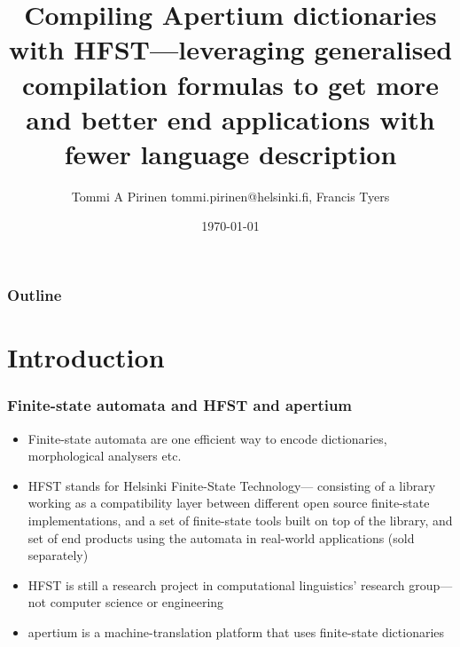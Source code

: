 \documentclass{beamer}
\title{Compiling Apertium dictionaries with HFST---leveraging generalised compilation formulas to get more and better end applications with fewer language description}
\author[Tommi A Pirinen]{Tommi A Pirinen \guilsinglleft{}tommi.pirinen@helsinki.fi\guilsinglright{}, Francis Tyers}
\institute{University of Helsinki, Universitat d'Alacant\\Department of Modern languages}
\date{\today}
\begin{document}
\maketitle

\begin{frame}
    \frametitle{Outline}
    \tableofcontents
\end{frame}



\section{Introduction}

\begin{frame}
    \frametitle{Finite-state automata and HFST and apertium}
    \begin{itemize}
        \item Finite-state automata are one efficient way to encode 
            dictionaries, morphological analysers etc.
        \item HFST stands for Helsinki Finite-State \alert{Technology}---
            consisting of a library working as a compatibility layer between
            different open source finite-state implementations, and a set of
            finite-state tools built on top of the library, and set of end
            products using the automata in real-world applications (sold
            separately)
        \item HFST is still a research project in computational linguistics'
            research group---not computer science or engineering
        \item apertium is a machine-translation platform that uses finite-state
            dictionaries
    \end{itemize}
\end{frame}
\end{document}
